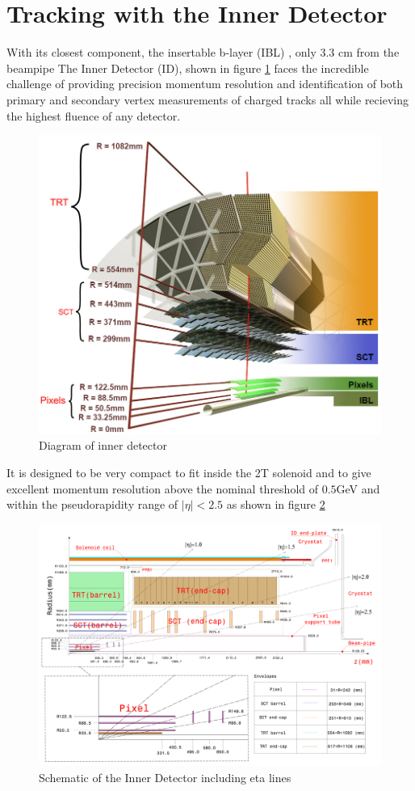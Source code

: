 \section{Tracking with the Inner Detector} \label{sec:atlas:tracking}

With its closest component, the insertable b-layer (IBL)
\cite{Potamianos:2209070}, only 3.3 cm from the beampipe The Inner Detector
(ID), shown in figure \ref{fig:inner_detector_diagram}
\cite{ATLAS-TDR-4,ATLAS-TDR-5} faces the incredible challenge of providing
precision momentum resolution and identification of both primary and secondary
vertex measurements of charged tracks all while recieving the highest fluence of any detector.

\begin{figure}[!htbp]
  \begin{center}
    \includegraphics[width=0.8\linewidth]{figures/atlas/inner_detector_diagram}
    \caption{ \cite{Potamianos:2209070} Diagram of inner detector}
    \label{fig:inner_detector_diagram}
  \end{center}
\end{figure}

It is designed to be very compact to fit inside the 2T solenoid and to give
excellent momentum resolution above the nominal \pT threshold of $0.5$GeV and
within the pseudorapidity range of $|\eta| < 2.5$ as shown in figure \ref{fig:inner_detector_schematic}

\begin{figure}[!htbp]
  \begin{center}
    \includegraphics[width=0.8\linewidth]{figures/atlas/inner_detector_schematic}
    \caption{ \cite{PIX-2018-001} Schematic of the Inner Detector including eta lines}
    \label{fig:inner_detector_schematic}
  \end{center}
\end{figure}


